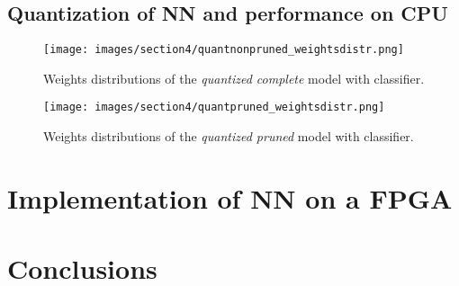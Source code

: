 \documentclass{article}
\begin{document}
\subsection{Quantization of NN and performance on CPU}

\begin{figure}[H]
  \centering
  \texttt{[image: images/section4/quantnonpruned\_weightsdistr.png]}
  \caption{Weights distributions of the \textit{quantized complete} model with classifier.}
  \label{fig:quantprun_weights}
\end{figure}

\begin{figure}[H]
  \centering
  \texttt{[image: images/section4/quantpruned\_weightsdistr.png]}
  \caption{Weights distributions of the \textit{quantized pruned} model with classifier.}
  \label{fig:quantprun_weights}
\end{figure}

\section{Implementation of NN on a FPGA}





\section{Conclusions}






\end{document}
